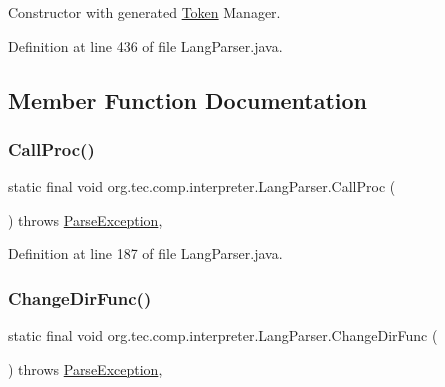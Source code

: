 Constructor with generated \mbox{\hyperlink{classorg_1_1tec_1_1comp_1_1interpreter_1_1_token}{Token}} Manager. 

Definition at line 436 of file Lang\+Parser.\+java.



\subsection{Member Function Documentation}
\mbox{\label{classorg_1_1tec_1_1comp_1_1interpreter_1_1_lang_parser_ad976526414dbf20d9a5d1e3dcd94cdba}} 
\subsubsection{\texorpdfstring{Call\+Proc()}{CallProc()}}
{\footnotesize\ttfamily static final void org.\+tec.\+comp.\+interpreter.\+Lang\+Parser.\+Call\+Proc (\begin{DoxyParamCaption}{ }\end{DoxyParamCaption}) throws \mbox{\hyperlink{classorg_1_1tec_1_1comp_1_1interpreter_1_1_parse_exception}{Parse\+Exception}}\hspace{0.3cm}{\ttfamily [inline]}, {\ttfamily [static]}}



Definition at line 187 of file Lang\+Parser.\+java.

\mbox{\label{classorg_1_1tec_1_1comp_1_1interpreter_1_1_lang_parser_a30f030763ddb2f3dd46d9f0806cb5e83}} 
\subsubsection{\texorpdfstring{Change\+Dir\+Func()}{ChangeDirFunc()}}
{\footnotesize\ttfamily static final void org.\+tec.\+comp.\+interpreter.\+Lang\+Parser.\+Change\+Dir\+Func (\begin{DoxyParamCaption}{ }\end{DoxyParamCaption}) throws \mbox{\hyperlink{classorg_1_1tec_1_1comp_1_1interpreter_1_1_parse_exception}{Parse\+Exception}}\hspace{0.3cm}{\ttfamily [inline]}, {\ttfamily [static]}}



